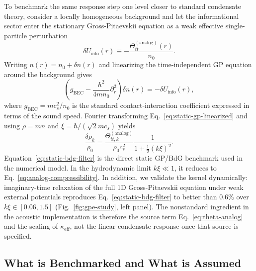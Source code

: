 \documentclass[aps,prd,twocolumn,superscriptaddress,nofootinbib,floatfix]{revtex4-2}
\begin{document}
To benchmark the same response step one level closer to standard condensate theory, consider a locally homogeneous background and let the informational sector enter the stationary Gross-Pitaevskii equation as a weak effective single-particle perturbation
\begin{equation}
    \delta U_{\mathrm{info}}(r) \equiv -\frac{\Theta_{tt}^{(\mathrm{analog})}(r)}{n_0}.
    \label{eq:delta-u-info}
\end{equation}
Writing $n(r)=n_0+\delta n(r)$ and linearizing the time-independent GP equation around the background gives
\begin{equation}
    \left(g_{\mathrm{BEC}}-\frac{\hbar^2}{4mn_0}\partial_r^2\right)\delta n(r)
    = -\delta U_{\mathrm{info}}(r),
    \label{eq:static-gp-linearized}
\end{equation}
where $g_{\mathrm{BEC}}=mc_s^2/n_0$ is the standard contact-interaction coefficient expressed in terms of the sound speed. Fourier transforming Eq.~\eqref{eq:static-gp-linearized} and using $\rho=mn$ and $\xi=\hbar/(\sqrt{2}mc_s)$ yields
\begin{equation}
    \frac{\delta \rho_k}{\rho_0}
    =
    \frac{\Theta_{tt,k}^{(\mathrm{analog})}}{\rho_0 c_s^2}
    \frac{1}{1+\tfrac{1}{2}(k\xi)^2}.
    \label{eq:static-bdg-filter}
\end{equation}
Equation~\eqref{eq:static-bdg-filter} is the direct static GP/BdG benchmark used in the numerical model. In the hydrodynamic limit $k\xi \ll 1$, it reduces to Eq.~\eqref{eq:analog-compressibility}. In addition, we validate the kernel dynamically: imaginary-time relaxation of the full 1D Gross-Pitaevskii equation under weak external potentials reproduces Eq.~\eqref{eq:static-bdg-filter} to better than $0.6\%$ over $k\xi \in [0.06, 1.5]$ (Fig.~\ref{fig:gpe-study}, left panel). The nonstandard ingredient in the acoustic implementation is therefore the source term Eq.~\eqref{eq:theta-analog} and the scaling of $\kappa_{\mathrm{eff}}$, not the linear condensate response once that source is specified.

\subsection{What is Benchmarked and What is Assumed}
\end{document}
